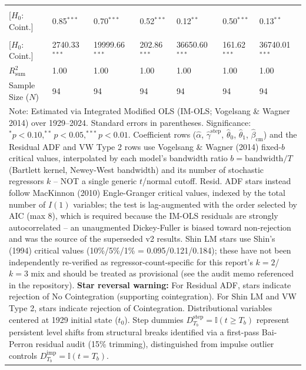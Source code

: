 \begin{table}[H]
\begin{tabular}{p{3.8cm}p{1.35cm}p{1.35cm}p{1.35cm}p{1.35cm}p{1.35cm}p{1.35cm}}
\makecell[l]{Shin LM ($C_{\text{Shin}}$) \\ {\scriptsize [$H_0$: Coint.]}} & 0.85$^{***}$ & 0.70$^{***}$ & 0.52$^{***}$ & 0.12$^{**}$ & 0.50$^{***}$ & 0.13$^{**}$  \\
\makecell[l]{VW Type 2 ($S_{\text{Type 2}}$) \\ {\scriptsize [$H_0$: Coint.]}} & 2740.33$^{***}$ & 19999.66$^{***}$ & 202.86$^{***}$ & 36650.60$^{***}$ & 161.62$^{***}$ & 36740.01$^{***}$  \\
\midrule
$R^2_{\text{sum}}$ & 1.00 & 1.00 & 1.00 & 1.00 & 1.00 & 1.00  \\
Sample Size ($N$) & 94 & 94 & 94 & 94 & 94 & 94  \\
\bottomrule
\multicolumn{7}{p{13.2cm}}{\footnotesize Note: Estimated via Integrated Modified OLS (IM-OLS; Vogelsang \& Wagner 2014) over 1929--2024. Standard errors in parentheses. Significance: $^*p<0.10, ^{**}p<0.05, ^{***}p<0.01$. Coefficient rows ($\hat{\alpha}$, $\hat{\gamma}^{\text{step}}$, $\hat{\theta}_0$, $\hat{\theta}_1$, $\hat{\beta}_{\text{cm}}$) and the Residual ADF and VW Type 2 rows use Vogelsang \& Wagner (2014) fixed-$b$ critical values, interpolated by each model's bandwidth ratio $b=\text{bandwidth}/T$ (Bartlett kernel, Newey-West bandwidth) and its number of stochastic regressors $k$ -- NOT a single generic $t$/normal cutoff. Resid. ADF stars instead follow MacKinnon (2010) Engle-Granger critical values, indexed by the total number of $I(1)$ variables; the test is lag-augmented with the order selected by AIC (max 8), which is required because the IM-OLS residuals are strongly autocorrelated -- an unaugmented Dickey-Fuller is biased toward non-rejection and was the source of the superseded v2 results. Shin LM stars use Shin's (1994) critical values (10\%/5\%/1\% = 0.095/0.121/0.184); these have not been independently re-verified as regressor-count-specific for this report's $k=2$/$k=3$ mix and should be treated as provisional (see the audit memo referenced in the repository). \textbf{Star reversal warning:} For Residual ADF, stars indicate rejection of No Cointegration (supporting cointegration). For Shin LM and VW Type 2, stars indicate rejection of Cointegration. Distributional variables centered at 1929 initial state ($t_0$). Step dummies $D^{\text{step}}_{T_b} = \mathbb{I}(t \ge T_b)$ represent persistent level shifts from structural breaks identified via a first-pass Bai-Perron residual audit (15\% trimming), distinguished from impulse outlier controls $D^{\text{imp}}_{T_b} = \mathbb{I}(t = T_b)$.}
\end{tabular}
\end{table}
